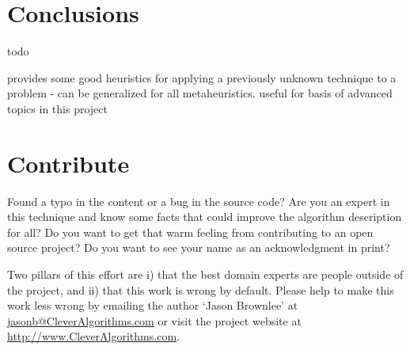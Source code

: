 \documentclass[a4paper, 11pt]{article}
\makeatletter
\newcommand{\myreportauthor}{Jason Brownlee}
\newcommand{\myreportemail}{jasonb@CleverAlgorithms.com}
\newcommand{\myreportwebsite}{http://www.CleverAlgorithms.com}
\makeatother
\begin{document}
% 
% 
\section{Conclusions}
\label{sec:conclusions}
todo


\cite{Gendreau2003}  provides some good heuristics for applying a previously unknown technique to a problem - can be generalized for all metaheuristics. useful for basis of advanced topics in this project

% 
% 
\section{Contribute}
\label{sec:contribute}
Found a typo in the content or a bug in the source code? 
Are you an expert in this technique and know some facts that could improve the algorithm description for all?
Do you want to get that warm feeling from contributing to an open source project? 
Do you want to see your name as an acknowledgment in print?

Two pillars of this effort are i) that the best domain experts are people outside of the project, and ii) that this work is wrong by default. 
Please help to make this work less wrong by emailing the author `\myreportauthor' at \url{\myreportemail} or visit the project website at \url{\myreportwebsite}.



\end{document}
